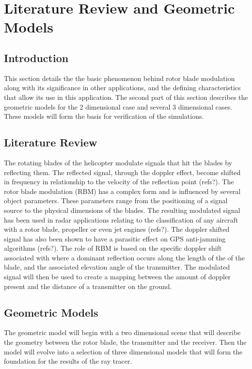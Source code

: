 \chapter{Literature Review and Geometric Models}

\section{Introduction}
This section details the the basic phenomenon behind rotor blade modulation along with its significance in other applications, and the defining characteristics that allow its use in this application. The second part of this section describes the geometric models for the 2 dimensional case and several 3 dimensional cases. These models will form the basis for verification of the simulations.

\section{Literature Review}
The rotating blades of the helicopter modulate signals that hit the blades by reflecting them. The reflected signal, through the doppler effect, become shifted in frequency in relationship to the velocity of the reflection point (refs?). The rotor blade modulation (RBM) has a complex form and is influenced by several object parameters. These parameters range from the positioning of a signal source to the physical dimensions of the blades. The resulting modulated signal has been used in radar applications relating to the classification of any aircraft with a rotor blade, propeller or even jet engines (refs?). The doppler shifted signal has also been shown to have a parasitic effect on GPS anti-jamming algorithms (refs?). The role of RBM is based on the specific doppler shift associated with where a dominant reflection occurs along the length of the of the blade, and the associated elevation angle of the transmitter. The modulated signal will then be used to create a mapping between the amount of doppler present and the distance of a transmitter on the ground.

\section{Geometric Models}
The geometric model will begin with a two dimensional scene that will describe the geometry between the rotor blade, the transmitter and the receiver. Then the model will evolve into a selection of three dimensional models that will form the foundation for the results of the ray tracer.

